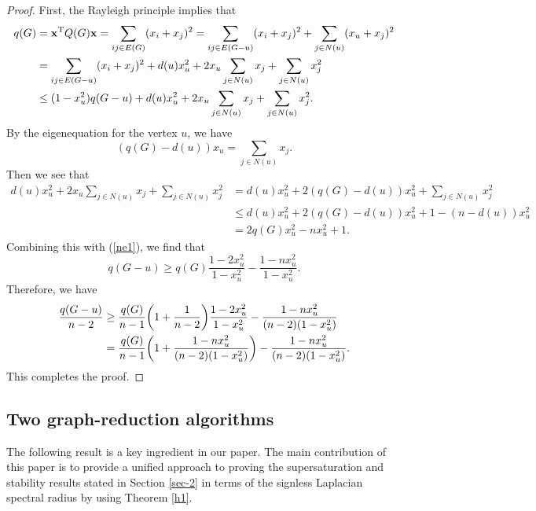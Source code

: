 \documentclass[11pt,a4paper]{article}
\theoremstyle{plain}
\theoremstyle{definition}
\begin{document}
\begin{proof}
First, the Rayleigh principle implies that
\begin{align}
q(G)&=\mathbf{x}^\mathrm{T}Q(G)\mathbf{x}=\sum_{ij\in E(G)}(x_{i}+x_{j})^{2}=\sum_{ij\in E(G-u)}(x_{i}+x_{j})^{2}+\sum_{j\in N (u)}(x_u+x_{j})^{2} \notag \\
&= \sum_{ij\in E(G-u)}(x_{i}+x_{j})^{2}+d(u)x_u^{2}+2x_u\sum_{j\in N (u)}x_{j}+\sum_{j\in N (u)}x_{j}^{2} \notag \\
&\leq (1-x_u^{2})q(G-u)+d(u)x_u^{2}+2x_u\sum_{j\in N (u)}x_{j}+\sum_{j\in N (u)}x_{j}^{2}. \label{ne1}
\end{align}
By the eigenequation for the vertex $u$, we have 
$$(q(G)-d(u))x_u =\sum_{j\in N (u)}x_{j}.$$
Then we see that
\begin{displaymath}
\begin{split}
d(u)x_u^{2}+2x_u\sum_{j\in N (u)}x_{j}+\sum_{j\in N (u)}x_{j}^{2}
&= d(u)x_u^{2}+2(q(G)-d(u))x_u^{2}+\sum_{j\in N (u)}x_{j}^{2}\\
&\leq d(u)x_u^{2}+2(q(G)-d(u))x_u^{2}+1-(n-d(u))x_u^{2}\\
&= 2q(G)x_u^{2}-nx_u^{2}+1.
\end{split}
\end{displaymath}
Combining this with (\ref{ne1}), we find that
\begin{equation*} 
q(G-u)\geq q(G)\frac{1-2x_u^{2}}{1-x_u^{2}}-\frac{1-nx_u^{2}}{1-x_u^{2}}.
\end{equation*} 
Therefore, we have
\begin{align*} \notag
\frac{q(G-u)}{n-2}&\geq\frac{q(G)}{n-1}\bigg(1+\frac{1}{n-2}\bigg)\frac{1-2x_u^{2}}{1-x_u^{2}}-\frac{1-nx_u^{2}}{(n-2)(1-x_u^{2})}\\ 
&= \frac{q(G)}{n-1}\bigg(1+\frac{1-nx_u^{2}}{(n-2)(1-x_u^{2})}\bigg)-\frac{1-nx_u^{2}}{(n-2)(1-x_u^{2})}. 
\end{align*}
This completes the proof. 
\end{proof}


\subsection{Two graph-reduction algorithms}

The following result is a key ingredient in our paper. 
 The main contribution of this paper is to provide a unified approach to proving the supersaturation and stability results stated in Section \ref{sec-2} in terms of the signless Laplacian spectral radius by using Theorem \ref{h1}. 
\end{document}
